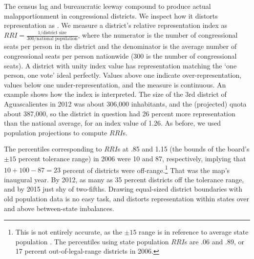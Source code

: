 \documentclass[letter,12pt]{article}
\begin{document}
The census lag and bureaucratic leeway compound to produce actual malapportionment in congressional districts. We inspect how it distorts representation as \citet{ansolabehere.gerber.snyderCourtRedis2002}. We measure a district's relative representation index as $RRI = \frac{1/\text{district size}}{300/\text{national population}}$, where the numerator is the number of congressional seats per person in the district and the denominator is the average number of congressional seats per person nationwide (300 is the number of congressional seats). A district with unity index value has representation matching the `one person, one vote' ideal perfectly. Values above one indicate over-representation, values below one under-representation, and the measure is continuous. An example shows how the index is interpreted. The size of the 3rd district of Aguascalientes in 2012 was about 306,000 inhabitants, and the (projected) quota about 387,000, so the district in question had 26 percent more representation than the national average, for an index value of 1.26. As before, we used population projections to compute $RRI$s.

The percentiles corresponding to $RRI$s at .85 and 1.15 (the bounds of the board's $\pm15$ percent tolerance range) in 2006 were 10 and 87, respectively, implying that $10+100-87=23$ percent of districts were off-range.\footnote{This is not entirely accurate, as the $\pm15$ range is in reference to average state population \citep[not average national population, analyzed here, see][]{altman.magar.mcd.trelles2014apsa}. The percentiles using state population $RRI$s are .06 and .89, or 17 percent out-of-legal-range districts in 2006.} That was the map's inaugural year. By 2012, as many as 35 percent districts off the tolerance range, and by 2015 just shy of two-fifths. Drawing equal-sized district boundaries with old population data is no easy task, and distorts representation within states over and above between-state imbalances.  
\end{document}
